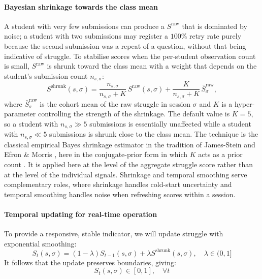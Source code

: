 \paragraph{Bayesian shrinkage towards the class mean}
A student with very few submissions can produce a $S^{\mathrm{raw}}$ that is dominated by noise; a student with two submissions may register a $100\%$ retry rate purely because the second submission was a repeat of a question, without that being indicative of struggle. 
To stabilise scores when the per-student observation count is small, $S^{\mathrm{raw}}$ is shrunk toward the class mean with a weight that depends on the student's submission count $n_{s,\sigma}$:
\begin{equation}
    S^{\mathrm{shrunk}}(s,\sigma)
    = \frac{n_{s,\sigma}}{n_{s,\sigma} + K}\,S^{\mathrm{raw}}(s,\sigma)
    + \frac{K}{n_{s,\sigma} + K}\,\bar{S}^{\mathrm{raw}}_{\sigma},
    \label{eq:struggle-shrunk}
\end{equation}
where $\bar{S}^{\mathrm{raw}}_{\sigma}$ is the cohort mean of the raw struggle in session $\sigma$ and $K$ is a hyper-parameter controlling the strength of the shrinkage. The default value is $K=5$, so a student with $n_{s,\sigma} \gg 5$ submissions is essentially unaffected while a student with $n_{s,\sigma} \ll 5$ submissions is shrunk close to the class mean. 
The technique is the classical empirical Bayes shrinkage estimator in the tradition of James-Stein and Efron \& Morris \cite{efronSteinsParadoxStatistics1977}, here in the conjugate-prior form in which $K$ acts as a prior count \cite{morrisParametricEmpiricalBayes1983,gelmanBayesianDataAnalysis2013}. It is applied here at the level of the aggregate struggle score rather than at the level of the individual signals. 
Shrinkage and temporal smoothing serve complementary roles, where shrinkage handles cold-start uncertainty and temporal smoothing handles noise when refreshing scores within a session.

\paragraph{Temporal updating for real-time operation}
To provide a responsive, stable indicator, we will update struggle with exponential smoothing:
\begin{equation}
    S_t(s,\sigma) = (1-\lambda)S_{t-1}(s,\sigma) + \lambda S^{\mathrm{shrunk}}(s,\sigma), \quad \lambda \in (0,1]
    \label{eq: temporal struggle}
\end{equation} 
It follows that the update preserves boundaries, giving:
\begin{equation*}
    S_t(s,\sigma) \in [0,1], \quad  \forall t
\end{equation*}

